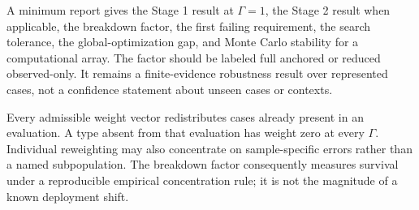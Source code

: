 \documentclass[11pt]{article}
\theoremstyle{remark}
\begin{document}
A minimum report gives the Stage 1 result at $\Gamma=1$, the Stage 2 result
when applicable, the breakdown factor, the first failing requirement, the
search tolerance, the global-optimization gap, and Monte Carlo stability for a
computational array. The factor should be labeled full anchored or reduced
observed-only. It remains a finite-evidence robustness result over represented
cases, not a confidence statement about unseen cases or contexts.

Every admissible weight vector redistributes cases already present in an
evaluation. A type absent from that evaluation has weight zero at every
$\Gamma$. Individual reweighting may also concentrate on sample-specific
errors rather than a named subpopulation. The breakdown factor consequently
measures survival under a reproducible empirical concentration rule; it is not
the magnitude of a known deployment shift.
\end{document}
